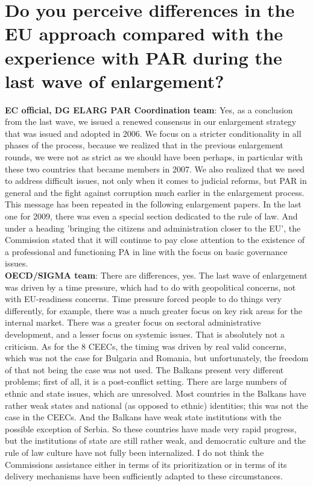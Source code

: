\section{Do you perceive differences in the EU approach compared with the experience with PAR during the last wave of enlargement? }
\label{sec:enlargement}
\textbf{EC official, DG ELARG PAR Coordination team}: Yes, as a conclusion from the last wave, we issued a renewed consensus in our enlargement strategy that was issued and adopted in 2006. We focus on a stricter conditionality in all phases of the process, because we realized that in the previous enlargement rounds, we were not as strict as we should have been perhaps, in particular with these two countries that became members in 2007. We also realized that we need to address difficult issues, not only when it comes to judicial reforms, but PAR in general and the fight against corruption much earlier in the enlargement process. This message has been repeated in the following enlargement papers. In the last one for 2009, there was even a special section dedicated to the rule of law. And under a heading 'bringing the citizens and administration closer to the EU', the Commission stated that it will continue to pay close attention to the existence of a professional and functioning PA in line with the focus on basic governance issues. \\
\textbf{OECD/SIGMA team}: There are differences, yes. The last wave of enlargement was driven by a time pressure, which had to do with geopolitical concerns, not with EU-readiness concerns. Time pressure forced people to do things very differently, for example, there was a much greater focus on key risk areas for the internal market. There was a greater focus on sectoral administrative development, and a lesser focus on systemic issues. That is absolutely not a criticism. As for the 8 CEECs, the timing was driven by real valid concerns, which was not the case for Bulgaria and Romania, but unfortunately, the freedom of that not being the case was not used. The Balkans present very different problems; first of all, it is a post-conflict setting. There are large numbers of ethnic and state issues, which are unresolved. Most countries in the Balkans have rather weak states and national (as opposed to ethnic) identities; this was not the case in the CEECs. And the Balkans have weak state institutions with the possible exception of Serbia. So these countries have made very rapid progress, but the institutions of state are still rather weak, and democratic culture and the rule of law culture have not fully been internalized. I do not think the Commissions assistance either in terms of its prioritization or in terms of its delivery mechanisms have been sufficiently adapted to these circumstances. \\
